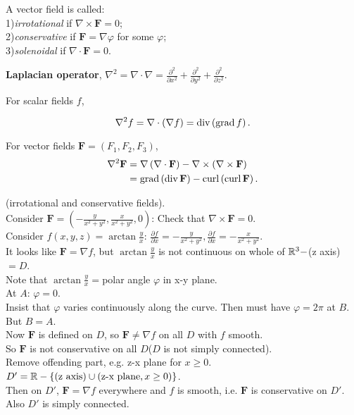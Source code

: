 \documentclass[a4paper]{article}
\begin{document}
\begin{defi}
A vector field is called:\\
1)\emph{irrotational} if $\nabla\times\mathbf{F}=0$;\\
2)\emph{conservative} if $\mathbf{F}=\nabla\varphi$ for some $\varphi$;\\
3)\emph{solenoidal} if $\nabla\cdot\mathbf{F}=0$.
\end{defi}

\textbf{Laplacian operator}, $\nabla^2=\nabla\cdot\nabla=\frac{\partial^2}{\partial x^2}+\frac{\partial^2}{\partial y^2}+\frac{\partial^2}{\partial z^2}$.

For scalar fields $f$,

\begin{equation*}
\nabla^2f=\nabla\cdot\left(\nabla f\right)=\operatorname{div}\left(\operatorname{grad} f\right).
\end{equation*}

For vector fields $\mathbf{F}=\left(F_{1},F_{2},F_{3}\right)$,
\begin{equation*}
\begin{aligned}
\nabla^2\mathbf{F}&=\nabla\left(\nabla\cdot\mathbf{F}\right)-\nabla\times\left(\nabla\times\mathbf{F}\right)\\
&=\operatorname{grad}\left(\operatorname{div}\mathbf{F}\right)-\operatorname{curl}\left(\operatorname{curl}\mathbf{F}\right).
\end{aligned}
\end{equation*}

\begin{eg} (irrotational and conservative fields).\\
	Consider $\mathbf{F}=\left(-\frac{y}{x^2+y^2},\frac{x}{x^2+y^2},0\right)$:
	Check that $\nabla\times\mathbf{F}=0$.\\
	Consider $f\left(x,y,z\right)=\arctan \frac{y}{x}$:
	$\frac{\partial f}{\partial x}=-\frac{y}{x^2+y^2},\frac{\partial f}{\partial x}=-\frac{x}{x^2+y^2}$.\\
	It looks like $\mathbf{F}=\nabla f$, but $\arctan \frac{y}{x}$ is not continuous on whole of $\mathbb{R}^3-$(z axis)$=D$.\\
	Note that $\arctan \frac{y}{x}=$polar angle $\varphi$ in x-y plane.\\
	At $A$: $\varphi = 0$.\\
	Insist that $\varphi$ varies continuously along the curve. Then must have $\varphi=2\pi$ at $B$. But $B=A$.\\
	Now $\mathbf{F}$ is defined on $D$, so $\mathbf{F}\neq\nabla f$ on all $D$ with $f$ smooth.\\
	So $\mathbf{F}$ is not conservative on all $D$($D$ is not simply connected).\\
	Remove offending part, e.g. z-x plane for $x\geq 0$.\\
	$D'=\mathbb{R}-\left\{(\text{z axis})\cup(\text{z-x plane},x\geq 0)\right\}$.\\
	Then on $D'$, $\mathbf{F}=\nabla f$ everywhere and $f$ is smooth, i.e. $\mathbf{F}$ is conservative on $D'$. Also $D'$ is simply connected.
	
\end{eg}
\end{document}
